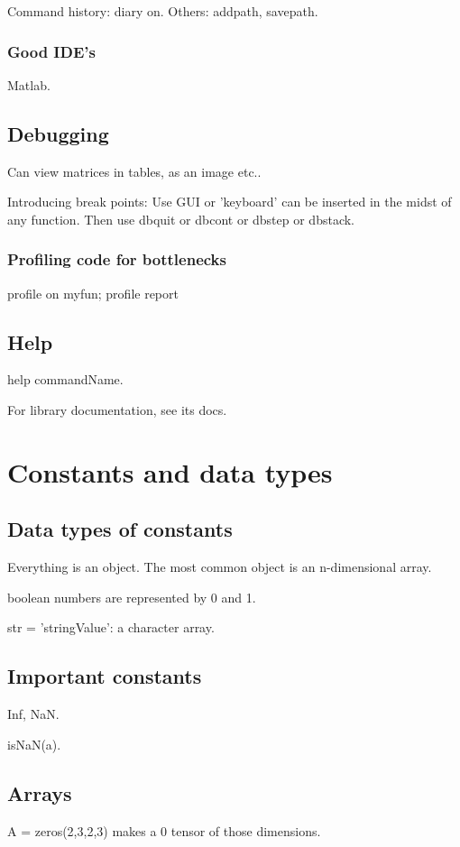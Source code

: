 Command history: diary on. Others: addpath, savepath.

\subsubsection{Good IDE's}
Matlab.

\subsection{Debugging}
Can view matrices in tables, as an image etc..

Introducing break points: Use GUI or 'keyboard' can be inserted in the midst of any function. Then use dbquit or dbcont or dbstep or dbstack.

\subsubsection{Profiling code for bottlenecks}
profile on
myfun;
profile report

\subsection{Help}
help commandName.

For library documentation, see its docs.

\section{Constants and data types}
\subsection{Data types of constants}
Everything is an object. The most common object is an n-dimensional array.

boolean numbers are represented by 0 and 1.

str = 'stringValue': a character array.

\subsection{Important constants}
Inf, NaN.

isNaN(a).

\subsection{Arrays}
A = zeros(2,3,2,3) makes a 0 tensor of those dimensions.

